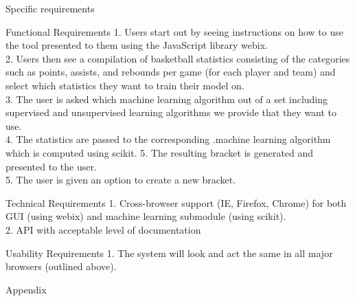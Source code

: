 \documentclass[letterpaper, 10pt,titlepage]{article}
\begin{document}
\begin{section}{Specific requirements}


\begin{subsection}{Functional Requirements}
1.	Users start out by seeing instructions on how to use the tool presented to them using the JavaScript library webix. \\
2.	Users then see a compilation of basketball statistics consisting of the categories such as points, assists, and rebounds per game (for each player and team) and select which statistics they want to train their model on. \\
3.   	The user is asked which machine learning algorithm out of a set including supervised and unsupervised learning algorithms we provide that they want to use. \\
4.      The statistics are passed to the corresponding .machine learning algorithm which is computed using scikit. 
5. 	The resulting bracket is generated and presented to the user. \\
5.      The user is given an option to create a new bracket. \\


\end{subsection}

\begin{subsection}{Technical Requirements}
1.       Cross-browser support (IE, Firefox, Chrome) for both GUI (using webix) and machine learning submodule (using scikit). \\
2.       API with acceptable level of documentation \\


\end{subsection}

\begin{subsection}{Usability Requirements}
1.       The system will look and act the same in all major browsers (outlined above). \\


\end{subsection}
\end{section}

\newpage

\begin{section}{Appendix}


\end{section}
\end{document}
